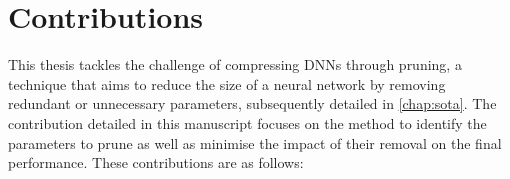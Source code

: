 






\section{Contributions}

This thesis tackles the challenge of compressing \acp{DNN} through pruning, a
technique that aims to reduce the size of a neural network by removing redundant
or unnecessary parameters, subsequently detailed in \cref{chap:sota}. The
contribution detailed in this manuscript focuses on the method to identify the
parameters to prune as well as minimise the impact of their removal on the final
performance. These contributions are as follows:\\

